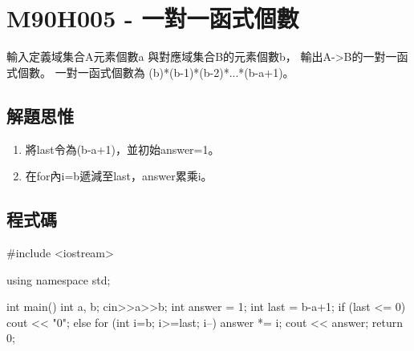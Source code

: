 \section{M90H005 - 一對一函式個數}
輸入定義域集合A元素個數a
與對應域集合B的元素個數b，
輸出A->B的一對一函式個數。 
一對一函式個數為 (b)*(b-1)*(b-2)*...*(b-a+1)。
\subsection{解題思惟}
\begin{enumerate}
	\item 將last令為(b-a+1)，並初始answer=1。
	\item 在for內i=b遞減至last，answer累乘i。
\end{enumerate}
\subsection{程式碼}
\begin{cppcode}
#include <iostream>

using namespace std;

int main()
{
	int a, b;
	cin>>a>>b;
	int answer = 1;
	int last = b-a+1;
	if (last <= 0) cout << "0";
	else {
		for (int i=b; i>=last; i--) answer *= i;
		cout << answer;
	}
	return 0;
}
\end{cppcode}
